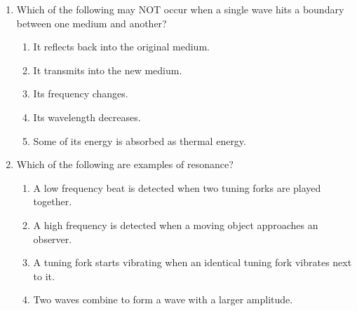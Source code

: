 \documentclass{../../../oss-apphys}
\begin{document}
\begin{multicols}{2}
\begin{enumerate}[leftmargin=18pt,resume]
  \item Which of the following may NOT occur when a single wave hits a boundary
    between one medium and another?
    \begin{enumerate}[nosep,leftmargin=18pt,label=(\Alph*)]
    \item It reflects back into the original medium.
    \item It transmits into the new medium.
    \item Its frequency changes.
    \item Its wavelength decreases.
    \item Some of its energy is absorbed as thermal energy.
    \end{enumerate}
    \vspace{.7in}
    
  \item Which of the following are examples of resonance?
    \label{multi-last}
    \begin{enumerate}[nosep,leftmargin=18pt,label=(\Alph*)]
    \item A low frequency beat is detected when two tuning forks are played
      together.
    \item A high frequency is detected when a moving object approaches an
      observer.
    \item A tuning fork starts vibrating when an identical tuning fork vibrates
      next to it.
    \item Two waves combine to form a wave with a larger amplitude.
    \end{enumerate}
  \end{enumerate}
\end{multicols}
\newpage


\genfreedirections
\end{document}
